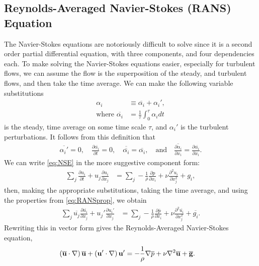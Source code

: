 \documentclass[10pt, titlepage]{article}
\begin{document}
\subsection{Reynolds-Averaged Navier-Stokes (RANS) Equation}
The Navier-Stokes equations are notoriously difficult to solve since it is a second order partial differential equation, with three components, and four dependencies each. To make solving the Navier-Stokes equations easier, especially for turbulent flows, we can assume the flow is the superposition of the steady, and turbulent flows, and then take the time average. We can make the following variable substitutions
\begin{align*}
\alpha_i &\equiv \overline{\alpha_i} + \alpha_i', \\
\text{where } \overline{\alpha_i} &= \frac{1}{\tau} \int_0^\tau \alpha_i dt
\end{align*}
is the steady, time average on some time scale $\tau$, and $\alpha_i'$ is the turbulent perturbations. It follows from this definition that
\begin{align}
\overline{\alpha_i'} = 0, \quad \frac{\partial \overline{\alpha_i}}{\partial t} = 0, \quad \overline{\overline{\alpha_i}} = \overline{\alpha_i}, \quad \text{and} \quad \overline{\frac{\partial \alpha_i}{\partial x_i}} =  \frac{\partial \overline{\alpha_i}}{\partial x_i}. \label{eq:RANSprop}
\end{align}
We can write \eqref{eq:NSE} in the more suggestive component form:
\begin{align*}
\sum_j \frac{\partial u_i}{\partial t} + u_j \frac{\partial u_i}{\partial x_j} &= \sum_j  -\frac{1}{\rho} \frac{\partial p}{\partial x_i} + \nu \frac{\partial^2 u_i}{\partial x_j^2} + g_i,
\end{align*}
then, making the appropriate substitutions, taking the time average, and using the properties from  \eqref{eq:RANSprop}, we obtain
\begin{align*}
\sum_j \overline{u_j} \frac{\partial \overline{u_i}}{\partial x_j} + u_j' \frac{\partial u_i'}{\partial x_j} &= \sum_j  -\frac{1}{\rho} \frac{\partial \overline{p}}{\partial x_i} + \nu \frac{\partial^2 \overline{u_i}}{\partial x_j^2} + \overline{g_i}.
\end{align*}
Rewriting this in vector form gives the Reynolds-Averaged Navier-Stokes equation,
\begin{align}
\left( \bf{\overline{u}} \cdot \nabla \right) \bf{\overline{u}} + \left( \bf{u'} \cdot \nabla \right) \bf{u'}&= - \frac{1}{\rho} \nabla \overline{p} + \nu \nabla^2 \bf{\overline{u}} + \bf{\overline{g}}. \label{eq:RANS}
\end{align}
\end{document}
